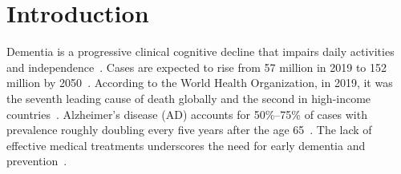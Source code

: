 
\section{Introduction}
  
Dementia is a progressive clinical cognitive decline that impairs daily activities and independence~\cite{grasset2018evolution}. Cases are expected to rise from 57 million in 2019 to 152 million by 2050~\cite{guo2024trajectory}. According to the World Health Organization, in 2019, it was the seventh leading cause of death globally and the second in high-income countries~\cite{johnsen2023incidence}. Alzheimer’s disease (AD) accounts for 50\%–75\% of cases with prevalence roughly doubling every five years after the age 65~\cite{lane2018alzheimer}. The lack of effective medical treatments underscores the need for early dementia and prevention~\cite{guo2024trajectory}.


